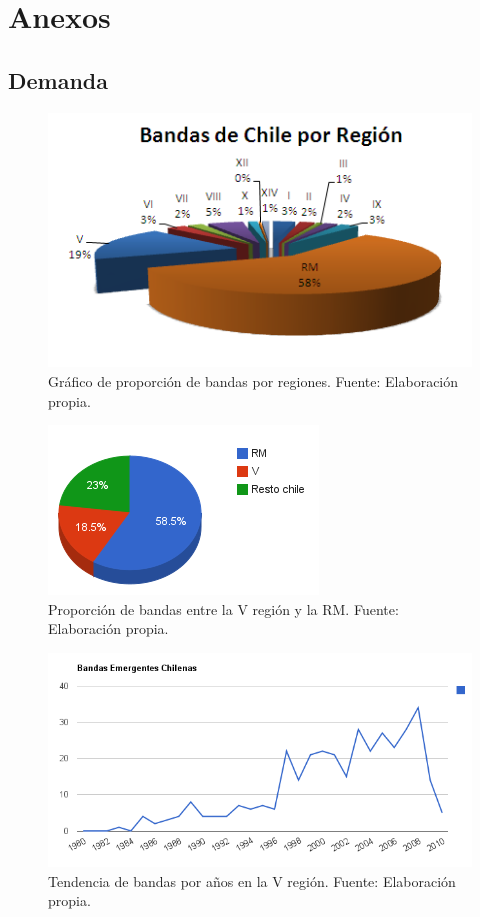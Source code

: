 \section{Anexos}
\subsection{Demanda}

\begin{figure}[h!]
    \centering
    \includegraphics[scale=0.75]{img/demanda1.png}
  \caption[Proporción de bandas de Chile por regiones]{Gráfico de proporción de
  bandas por regiones. Fuente: Elaboración propia.}
\end{figure}


\begin{figure}[h!]
    \centering
    \includegraphics[]{img/demanda2.png}
  \caption[Proporción de bandas entre la V región y la RM]{Proporción de bandas
  entre la V región y la RM. Fuente: Elaboración propia.}
\end{figure}

\begin{figure}[h!]
    \centering
    \includegraphics[angle=-90,scale=0.75]{img/demanda3.png}
  \caption[Tendencia de bandas por años en la V región]{Tendencia de bandas por
  años en la V región. Fuente: Elaboración propia.}
\end{figure}


